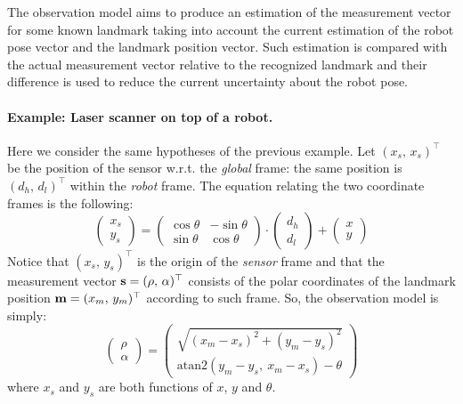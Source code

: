 	The observation model aims to produce an estimation of the measurement vector for some known landmark taking into account the current estimation of the robot pose vector and the landmark position vector. 
	Such estimation is compared with the actual measurement vector relative to the recognized landmark and their difference is used to reduce the current uncertainty about the robot pose. 
	
	\paragraph{Example: Laser scanner on top of a robot.}
		Here we consider the same hypotheses of the previous example.
		Let $(x_s,\, x_s)^\top$ be the position of the sensor w.r.t. the \emph{global} frame: the same position is $(d_h,\, d_l)^\top$ within the \emph{robot} frame.
		The equation relating the two coordinate frames is the following:
		\begin{equation}
			\left(\begin{array}{c}
				x_s \\ y_s
			\end{array}\right)
			=
			\left(\begin{array}{ccc}
				\cos{\theta} & -\sin{\theta} \\
				\sin{\theta} & \cos{\theta}
			\end{array}\right)
			\cdot
			\left(\begin{array}{c}
				d_h \\ d_l
			\end{array}\right)
			+
			\left(\begin{array}{c}
				x \\ y
			\end{array}\right)
		\end{equation}
		Notice that $(x_s,\, y_s)^\top$ is the origin of the \emph{sensor} frame and that the measurement vector $\boldsymbol{\mathrm{{s}}} = (\rho,\, \alpha)^\top$ consists of the polar coordinates of the landmark position $\boldsymbol{\mathrm{{m}}} = (x_m,\, y_m)^\top$ according to such frame.
		So, the observation model is simply:
		\[
			\left(\begin{array}{c}
				\rho \\ \alpha
			\end{array}\right)
			=
			\left(\begin{array}{ccc}
				\sqrt{(x_m - x_s)^2 + (y_m - y_s)^2} \\
				\mathrm{atan2}(y_m - y_s,\ x_m - x_s) - \theta
			\end{array}\right)
		\]
		where $x_s$ and $y_s$ are both functions of $x$, $y$ and $\theta$.
		
